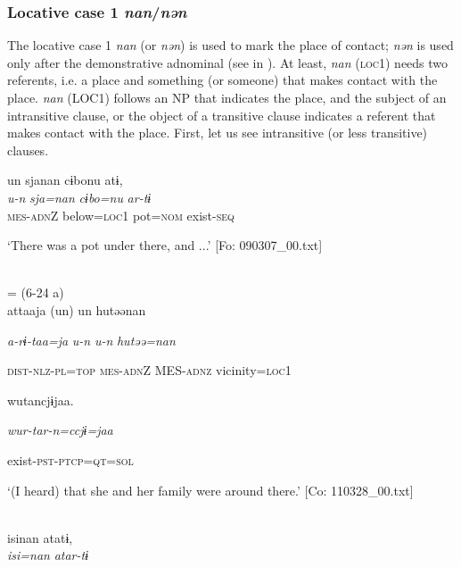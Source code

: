 \subsubsection{Locative case 1 \textit{nan}/\textit{nən}}

The locative case 1 \textit{nan} (or \textit{nən}) is used to mark the place of contact; \textit{nən} is used only after the demonstrative adnominal (see  in ). At least, \textit{nan} (\textsc{loc}1) needs two referents, i.e. a place and something (or someone) that makes contact with the place. \textit{nan} (LOC1) follows an NP that indicates the place, and the subject of an intransitive clause, or the object of a transitive clause indicates a referent that makes contact with the place. First, let us see intransitive (or less transitive) clauses.

\ea\label{ex:6-61}
\ea {\TM}  un  sjanan  cɨbonu  atɨ,\\
\gll \textit{u-n}  \textit{sja=nan}  \textit{cɨbo=nu}  \textit{ar-tɨ}\\

      \textsc{mes}-\textsc{adn}Z  below=\textsc{loc}1  pot=\textsc{nom}  exist-\textsc{seq}

\glt ‘There was a pot under there, and ...’ [Fo: 090307\_00.txt]
\z

 \ex{}\\
\gll = (6-24 a)\\

{\TM}
\gll attaaja  (un)  un  hutəənan

      \textit{a-rɨ-taa=ja}  \textit{u-n}  \textit{u-n}  \textit{hutəə=nan}

      \textsc{dist}-\textsc{nlz}-\textsc{pl}=\textsc{top}  \textsc{mes}-\textsc{adn}Z  MES-\textsc{adnz}  vicinity=\textsc{loc}1

      wutancjɨjaa.

      \textit{wur-tar-n=ccjɨ=jaa}

      exist-\textsc{pst}-\textsc{ptcp}=\textsc{qt}=\textsc{sol}

\glt ‘(I heard) that she and her family were around there.’ [Co: 110328\_00.txt]
\z

 \ex{}\\
{\TM}
\gll  isinan  atatɨ,\\

      \textit{isi=nan}  \textit{atar-tɨ}

